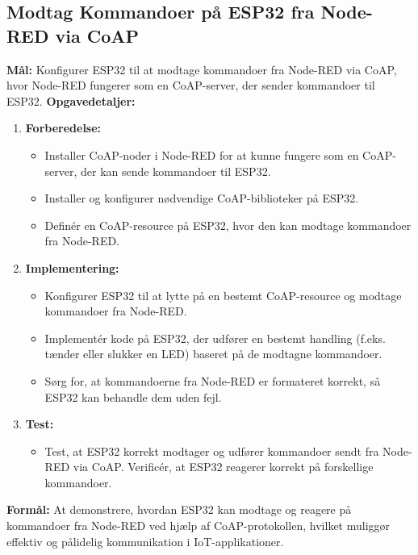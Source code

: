 \subsection*{Modtag Kommandoer på ESP32 fra Node-RED via CoAP}
\textbf{Mål:} Konfigurer ESP32 til at modtage kommandoer fra Node-RED via CoAP, hvor Node-RED fungerer som en CoAP-server, der sender kommandoer til ESP32.
\newline\newline\noindent
\textbf{Opgavedetaljer:}
\begin{enumerate}
	\item \textbf{Forberedelse:}
	\begin{itemize}
		\item Installer CoAP-noder i Node-RED for at kunne fungere som en CoAP-server, der kan sende kommandoer til ESP32.
		\item Installer og konfigurer nødvendige CoAP-biblioteker på ESP32.
		\item Definér en CoAP-resource på ESP32, hvor den kan modtage kommandoer fra Node-RED.
	\end{itemize}
	\item \textbf{Implementering:}
	\begin{itemize}
		\item Konfigurer ESP32 til at lytte på en bestemt CoAP-resource og modtage kommandoer fra Node-RED.
		\item Implementér kode på ESP32, der udfører en bestemt handling (f.eks. tænder eller slukker en LED) baseret på de modtagne kommandoer.
		\item Sørg for, at kommandoerne fra Node-RED er formateret korrekt, så ESP32 kan behandle dem uden fejl.
	\end{itemize}
	\item \textbf{Test:}
	\begin{itemize}
		\item Test, at ESP32 korrekt modtager og udfører kommandoer sendt fra Node-RED via CoAP. Verificér, at ESP32 reagerer korrekt på forskellige kommandoer.
	\end{itemize}
\end{enumerate}
\textbf{Formål:} At demonstrere, hvordan ESP32 kan modtage og reagere på kommandoer fra Node-RED ved hjælp af CoAP-protokollen, hvilket muliggør effektiv og pålidelig kommunikation i IoT-applikationer.
